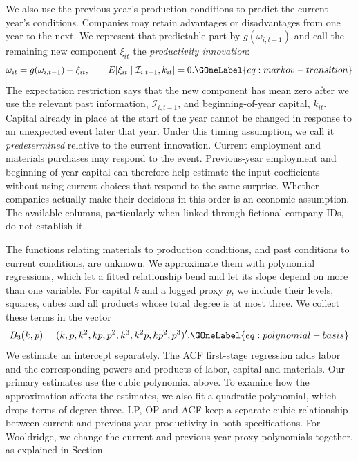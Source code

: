We also use the previous year's production conditions to predict the current year's conditions. Companies may retain advantages or disadvantages from one year to the next. We represent that predictable part by $g(\omega_{i,t-1})$ and call the remaining new component $\xi_{it}$ the \emph{productivity innovation}:
\begin{equation}
\omega_{it}=g(\omega_{i,t-1})+\xi_{it},\qquad
E[\xi_{it}\mid\mathcal I_{i,t-1},k_{it}]=0.
\GOneLabel{eq:markov-transition}
\end{equation}
The expectation restriction says that the new component has mean zero after we use the relevant past information, $\mathcal I_{i,t-1}$, and beginning-of-year capital, $k_{it}$. Capital already in place at the start of the year cannot be changed in response to an unexpected event later that year. Under this timing assumption, we call it \emph{predetermined} relative to the current innovation. Current employment and materials purchases may respond to the event. Previous-year employment and beginning-of-year capital can therefore help estimate the input coefficients without using current choices that respond to the same surprise. Whether companies actually make their decisions in this order is an economic assumption. The available columns, particularly when linked through fictional company IDs, do not establish it.

The functions relating materials to production conditions, and past conditions to current conditions, are unknown. We approximate them with polynomial regressions, which let a fitted relationship bend and let its slope depend on more than one variable. For capital $k$ and a logged proxy $p$, we include their levels, squares, cubes and all products whose total degree is at most three. We collect these terms in the vector
\begin{equation}
B_3(k,p)=(k,p,k^2,kp,p^2,k^3,k^2p,kp^2,p^3)' .
\GOneLabel{eq:polynomial-basis}
\end{equation}
We estimate an intercept separately. The ACF first-stage regression adds labor and the corresponding powers and products of labor, capital and materials. Our primary estimates use the cubic polynomial above. To examine how the approximation affects the estimates, we also fit a quadratic polynomial, which drops terms of degree three. LP, OP and ACF keep a separate cubic relationship between current and previous-year productivity in both specifications. For Wooldridge, we change the current and previous-year proxy polynomials together, as explained in Section~.

